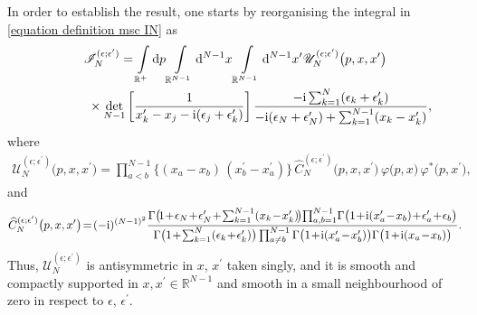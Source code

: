 \documentclass[pdftex]{sigma}%
\numberwithin{equation}{section}
\begin{document}
In order to establish the result, one starts by reorganising the integral in \eqref{equation definition msc IN} as
\begin{gather*}
\mathscr{I}_N^{(\epsilon;\epsilon^{\prime})} = \int\limits_{\mathbb{R}^+}{} {\rm d}p \int\limits_{\mathbb{R}^{N-1}}{}
{\rm d}^{N-1}x \int\limits_{\mathbb{R}^{N-1}}{} {\rm d}^{N-1}x^{\prime}
\mathscr{U}_N^{(\epsilon;\epsilon^{\prime})}\big(p,x,x^{\prime} \big)
 \\ \hphantom{\mathscr{I}_N^{(\epsilon;\epsilon^{\prime})} =}
\times \det_{N-1}\bigg[ \frac{1}{x^{\prime}_k-x_j-{\rm i} (\epsilon_j+\epsilon_k^{\prime}) } \bigg] \,
\frac{-{\rm i} \sum_{k=1}^{N}(\epsilon_k+\epsilon_k^{\prime}) }{-{\rm i}(\epsilon_N+\epsilon_N^{\prime}) + \sum_{k=1}^{N-1}(x_k - x_k^{\prime}) },
\end{gather*}
where
\begin{gather*}
\mathscr{U}_N^{(\epsilon;\epsilon^{\prime})}\big(p,x,x^{\prime} \big) =
 \prod\limits_{a<b}^{N-1} \big\{ (x_{a}-x_{b})\, (x_{b}^{\prime}-x_{a}^{\prime}) \big\} \,
\widehat{C}_N^{(\epsilon;\epsilon^{\prime})}\big(p,x,x^{\prime} \big) \, \varphi\big(p,x\big) \, \varphi^{*}\big(p,x^{\prime}\big) ,
\end{gather*}
and
\begin{gather*}
\widehat{C}_N^{(\epsilon;\epsilon^{\prime})}\big(p,x,x^{\prime} \big) \! =\! (-{\rm i})^{(N-1)^2}
\frac{ \Gamma\big(\! 1\!+\! \epsilon_N\!+\!\epsilon^{\prime}_N\! +\!\sum_{k=1}^{N-1}(x_k \!-\! x_k^{\prime})\! \big) \!\prod_{ a,b=1 }^{ N-1 }\!
 \Gamma\big(1\!+\!{\rm i}(x_a^{\prime}\!-\!x_b)\!+\!\epsilon'_a\!+\!\epsilon_b \big) }{
 \Gamma\big( 1\!+\! \sum_{k=1}^{N}(\epsilon_k\! +\! \epsilon_k^{\prime}) \big) \prod_{ a \not= b }^{ N-1 }
 \Gamma\big(1\!+\!{\rm i} (x_{a}^{\prime}\!-\!x_{b}^{\prime})\big) \Gamma\big( 1\!+\!{\rm i} (x_{a}\!-\!x_{b}) \big) }.
\end{gather*}
Thus, $\mathscr{U}_N^{(\epsilon;\epsilon^{\prime})}$ is antisymmetric in $x$, $x^{\prime}$ taken singly, and it is smooth and compactly
supported in $x, x^{\prime} \in \mathbb{R}^{N-1}$ and smooth in a small neighbourhood of zero in respect to $\epsilon$, $\epsilon^{\prime}$.
\end{document}
